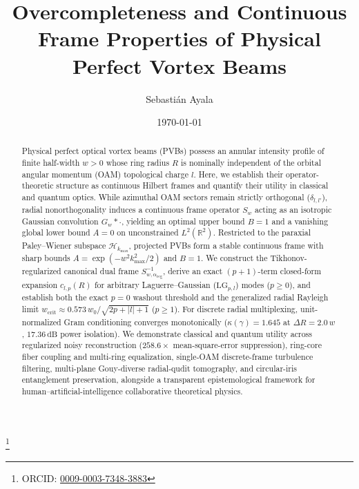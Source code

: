 \documentclass[aps,pra,reprint,amsmath,amssymb,floatfix,longbibliography]{revtex4-2}
\providecommand{\abs}[1]{\lvert#1\rvert}
\begin{document}
\title{Overcompleteness and Continuous Frame Properties of Physical Perfect Vortex Beams}

\author{Sebasti\'an Ayala}
\thanks{ORCID: \href{https://orcid.org/0009-0003-7348-3883}{0009-0003-7348-3883}}

\date{\today}

\begin{abstract}
Physical perfect optical vortex beams (PVBs) possess an annular intensity profile of finite half-width $w > 0$ whose ring radius $R$ is nominally independent of the orbital angular momentum (OAM) topological charge $l$. Here, we establish their operator-theoretic structure as continuous Hilbert frames and quantify their utility in classical and quantum optics. While azimuthal OAM sectors remain strictly orthogonal ($\delta_{l,l'}$), radial nonorthogonality induces a continuous frame operator $S_w$ acting as an isotropic Gaussian convolution $G_w * \cdot$, yielding an optimal upper bound $B = 1$ and a vanishing global lower bound $A = 0$ on unconstrained $L^2(\mathbb{R}^2)$. Restricted to the paraxial Paley--Wiener subspace $\mathcal{H}_{k_{\max}}$, projected PVBs form a stable continuous frame with sharp bounds $A = \exp(-w^2 k_{\max}^2/2)$ and $B = 1$. We construct the Tikhonov-regularized canonical dual frame $S_{w,\alpha_{\mathrm{reg}}}^{-1}$, derive an exact $(p+1)$-term closed-form expansion $c_{l,p}(R)$ for arbitrary Laguerre--Gaussian ($\mathrm{LG}_{p,l}$) modes ($p \ge 0$), and establish both the exact $p=0$ washout threshold and the generalized radial Rayleigh limit $w_{\mathrm{crit}} \approx 0.573\,w_0/\sqrt{2p+\abs{l}+1}$ ($p \ge 1$). For discrete radial multiplexing, unit-normalized Gram conditioning converges monotonically ($\kappa(\gamma) = 1.645$ at $\Delta R = 2.0\,w$, $17.36\,\mathrm{dB}$ power isolation). We demonstrate classical and quantum utility across regularized noisy reconstruction ($258.6\times$ mean-square-error suppression), ring-core fiber coupling and multi-ring equalization, single-OAM discrete-frame turbulence filtering, multi-plane Gouy-diverse radial-qudit tomography, and circular-iris entanglement preservation, alongside a transparent epistemological framework for human--artificial-intelligence collaborative theoretical physics.
\end{abstract}

\maketitle
\end{document}
